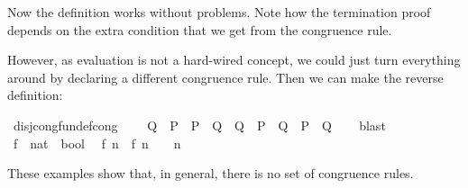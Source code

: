 \begin{isabellebody}
\begin{isamarkuptext}
  Now the definition works without problems. Note how the termination
  proof depends on the extra condition that we get from the congruence
  rule.

  However, as evaluation is not a hard-wired concept, we
  could just turn everything around by declaring a different
  congruence rule. Then we can make the reverse definition:%
\end{isamarkuptext}%
\isamarkuptrue%
\isamarkupfalse%
\ disj{}cong{}{}fundef{}cong{}{}\ \isanewline
\ \ {}{}{}\ Q{}\ {}\ P\ {}\ P{}{}\ {}\ {}Q\ {}\ Q{}{}\ {}\ {}P\ {}\ Q{}\ {}\ {}P{}\ {}\ Q{}{}{}\isanewline
%
\isadelimproof
\ \ %
\endisadelimproof
%
\isatagproof
{}\isamarkupfalse%
\ blast%
\endisatagproof
{\isafoldproof}%
%
\isadelimproof
\isanewline
%
\endisadelimproof
\isanewline
{}\isamarkupfalse%
\ f{}\ {}{}\ {}nat\ {}\ bool{}\isanewline
{}\isanewline
\ \ {}f{}\ n\ {}\ {}f{}\ {}n\ {}\ {}{}\ {}\ n\ {}\ {}{}{}%
\begin{isamarkuptext}%
\noindent These examples show that, in general, there is no  set of
  congruence rules.


\end{isamarkuptext}
\end{isabellebody}

